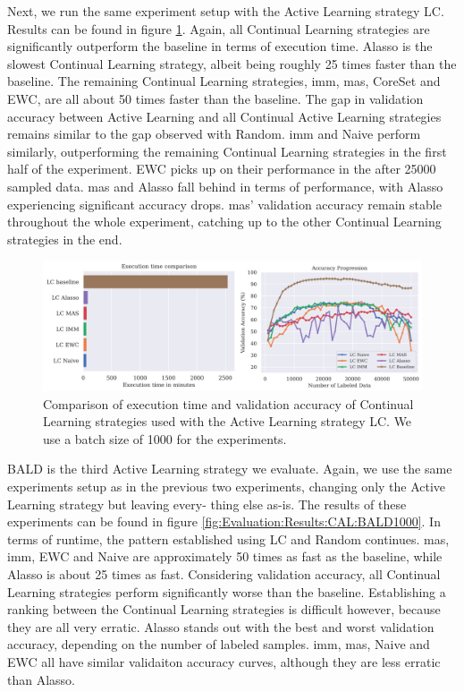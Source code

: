Next, we run the same experiment setup with the Active Learning strategy LC. Results can be found in figure \ref{fig:Evaluation:Results:CAL:LC1000}. Again, all Continual Learning strategies
are significantly outperform the baseline in terms of execution time. Alasso is the slowest Continual Learning strategy, albeit being roughly 25 times faster than the baseline. The remaining Continual
Learning strategies, \gls{imm}, \gls{mas}, CoreSet and EWC, are all about 50 times faster than the baseline. The gap in validation accuracy between Active Learning and all Continual Active Learning strategies
remains similar to the gap observed with Random. \gls{imm} and Naive perform similarly, outperforming the remaining Continual Learning strategies in the first half of the experiment. EWC picks up on their
performance in the after 25000 sampled data. \gls{mas} and Alasso fall behind in terms of performance, with Alasso experiencing significant accuracy drops. \gls{mas}' validation accuracy remain stable throughout
the whole experiment, catching up to the other Continual Learning strategies in the end. \par

\begin{figure} [h]
    \centering
    \includegraphics[width=\linewidth]{images/results_CAL/LC_CAL_1000b.png}
    \caption[Continual Active Learning LC 1000 batch size]{Comparison of execution time and validation accuracy of Continual Learning strategies used with the Active Learning strategy LC.
    We use a batch size of 1000 for the experiments.}
    \label{fig:Evaluation:Results:CAL:LC1000}
\end{figure}

BALD is the third Active Learning strategy we evaluate. Again, we use the same experiments setup as in the previous two experiments, changing only the Active Learning strategy but leaving every-
thing else as-is. The results of these experiments can be found in figure \ref{fig:Evaluation:Results:CAL:BALD1000}. In terms of runtime, the pattern established using LC and Random continues.
\gls{mas}, \gls{imm}, EWC and Naive are approximately 50 times as fast as the baseline, while Alasso is about 25 times as fast. Considering validation accuracy, all Continual Learning strategies perform significantly
worse than the baseline. Establishing a ranking between the Continual Learning strategies is difficult however, because they are all very erratic. Alasso stands out with the best and worst validation
accuracy, depending on the number of labeled samples. \gls{imm}, \gls{mas}, Naive and EWC all have similar validaiton accuracy curves, although they are less erratic than Alasso. \par

